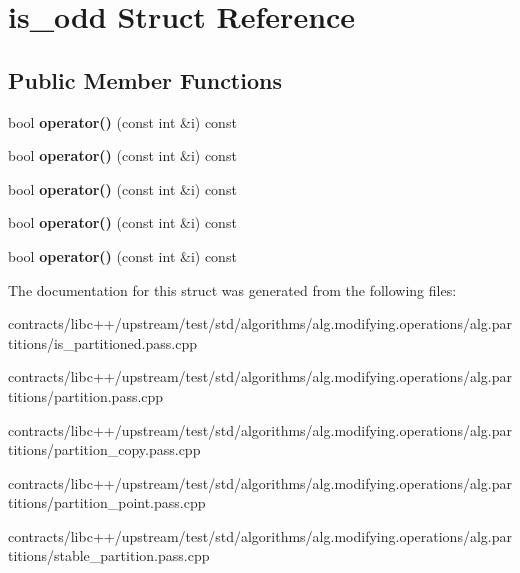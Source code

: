 \hypertarget{structis__odd}{}\section{is\+\_\+odd Struct Reference}
\label{structis__odd}
\subsection*{Public Member Functions}
\begin{DoxyCompactItemize}
\item 
\mbox{\label{structis__odd_a8611ce18a91e1588f28860830ba3eb4e}} 
bool {\bfseries operator()} (const int \&i) const
\item 
\mbox{\label{structis__odd_a8611ce18a91e1588f28860830ba3eb4e}} 
bool {\bfseries operator()} (const int \&i) const
\item 
\mbox{\label{structis__odd_a8611ce18a91e1588f28860830ba3eb4e}} 
bool {\bfseries operator()} (const int \&i) const
\item 
\mbox{\label{structis__odd_a8611ce18a91e1588f28860830ba3eb4e}} 
bool {\bfseries operator()} (const int \&i) const
\item 
\mbox{\label{structis__odd_a8611ce18a91e1588f28860830ba3eb4e}} 
bool {\bfseries operator()} (const int \&i) const
\end{DoxyCompactItemize}


The documentation for this struct was generated from the following files\+:\begin{DoxyCompactItemize}
\item 
contracts/libc++/upstream/test/std/algorithms/alg.\+modifying.\+operations/alg.\+partitions/is\+\_\+partitioned.\+pass.\+cpp\item 
contracts/libc++/upstream/test/std/algorithms/alg.\+modifying.\+operations/alg.\+partitions/partition.\+pass.\+cpp\item 
contracts/libc++/upstream/test/std/algorithms/alg.\+modifying.\+operations/alg.\+partitions/partition\+\_\+copy.\+pass.\+cpp\item 
contracts/libc++/upstream/test/std/algorithms/alg.\+modifying.\+operations/alg.\+partitions/partition\+\_\+point.\+pass.\+cpp\item 
contracts/libc++/upstream/test/std/algorithms/alg.\+modifying.\+operations/alg.\+partitions/stable\+\_\+partition.\+pass.\+cpp\end{DoxyCompactItemize}
